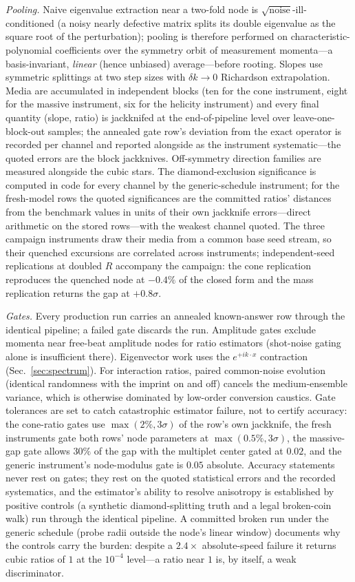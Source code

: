 \documentclass[aps,prd,twocolumn,superscriptaddress,nofootinbib,floatfix]{revtex4-2}
\begin{document}
\emph{Pooling.} Naive eigenvalue extraction near a two-fold node is
$\sqrt{\text{noise}}$-ill-conditioned (a noisy nearly defective matrix
splits its double eigenvalue as the square root of the perturbation);
pooling is therefore performed on characteristic-polynomial coefficients
over the symmetry orbit of measurement momenta---a basis-invariant,
\emph{linear} (hence unbiased) average---before rooting. Slopes use
symmetric splittings at two step sizes with $\delta k\to0$ Richardson
extrapolation. Media are accumulated in independent blocks (ten for the
cone instrument, eight for the massive instrument, six for the helicity
instrument) and every final quantity (slope, ratio) is jackknifed at the
end-of-pipeline level over leave-one-block-out samples; the annealed gate
row's deviation from the exact operator is recorded per channel and
reported alongside as the instrument systematic---the quoted errors are
the block jackknives. Off-symmetry direction families are measured alongside the
cubic stars. The diamond-exclusion significance is computed in code for
every channel by the generic-schedule instrument; for the fresh-model
rows the quoted significances are the committed ratios' distances from
the benchmark values in units of their own jackknife errors---direct
arithmetic on the stored rows---with the weakest channel quoted. The
three campaign instruments draw their media from a common base seed
stream, so their quenched excursions are correlated across
instruments; independent-seed replications at doubled $R$ accompany
the campaign: the cone replication reproduces the quenched node at
$-0.4\%$ of the closed form and the mass replication returns the gap
at $+0.8\sigma$.

\emph{Gates.} Every production run carries an annealed known-answer row
through the identical pipeline; a failed gate discards the run. Amplitude
gates exclude momenta near free-beat amplitude nodes for ratio estimators
(shot-noise gating alone is insufficient there). Eigenvector work uses the
$e^{+ik\cdot x}$ contraction (Sec.~\ref{sec:spectrum}). For interaction
ratios, paired common-noise evolution (identical randomness with the
imprint on and off) cancels the medium-ensemble variance, which is
otherwise dominated by low-order conversion caustics. Gate tolerances are
set to catch catastrophic estimator failure, not to certify accuracy:
the cone-ratio gates use $\max(2\%, 3\sigma)$ of the row's own
jackknife, the fresh instruments gate both rows' node parameters at
$\max(0.5\%,3\sigma)$, the massive-gap gate allows $30\%$ of the gap
with the multiplet center gated at $0.02$, and the generic instrument's
node-modulus gate is $0.05$ absolute. Accuracy statements never rest on gates;
they rest on the quoted statistical errors and the recorded systematics,
and the estimator's ability to resolve anisotropy is established by
positive controls (a synthetic diamond-splitting truth and a legal
broken-coin walk) run through the identical pipeline. A committed
broken run under the generic schedule (probe radii outside the node's
linear window) documents why the controls carry the burden: despite a
$2.4\times$ absolute-speed failure it returns cubic ratios of $1$ at
the $10^{-4}$ level---a ratio near $1$ is, by itself, a weak
discriminator.
\end{document}

